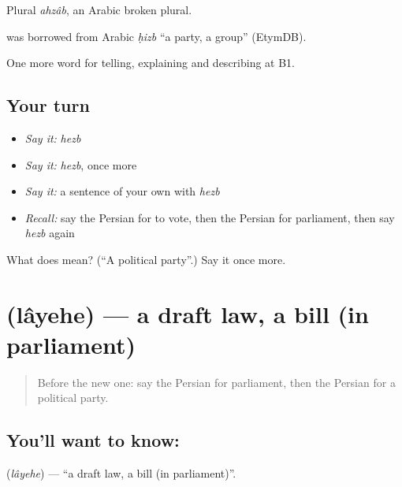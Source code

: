 Plural \emph{ahzâb}, an Arabic broken plural.

\begin{cousinweb}
\textbf{} was borrowed from Arabic \emph{ḥizb} \textquotedblleft{}a party, a group\textquotedblright{} (EtymDB).
\end{cousinweb}

\begin{grammarlens}[title={What you've built}]
One more word for telling, explaining and describing at B1.
\end{grammarlens}

\subsection*{Your turn}
\begin{itemize}
\raggedright
  \item \emph{Say it:} \emph{hezb}
  \item \emph{Say it:} \emph{hezb}, once more
  \item \emph{Say it:} a sentence of your own with \emph{hezb}
  \item \emph{Recall:} say the Persian for to vote, then the Persian for parliament, then say \emph{hezb} again
\end{itemize}

\begin{tcolorbox}[breakable,colback=teal!4,colframe=teal!35!black,title={Before you move on}]
What does  mean? (\textquotedblleft{}A political party\textquotedblright{}.) Say it once more.
\end{tcolorbox}
\section[\texorpdfstring{\fa{لایحه} (lâyehe)}{لایحه (lâyehe)}]{ (lâyehe) — a draft law, a bill (in parliament)}

\label{lesson:FA-C410-layehe}



\begin{quote}
Before the new one: say the Persian for parliament, then the Persian for a political party.
\end{quote}

\subsection*{You'll want to know: }
\textbf{} (\emph{lâyehe}) — \textquotedblleft{}a draft law, a bill (in parliament)\textquotedblright{}.

